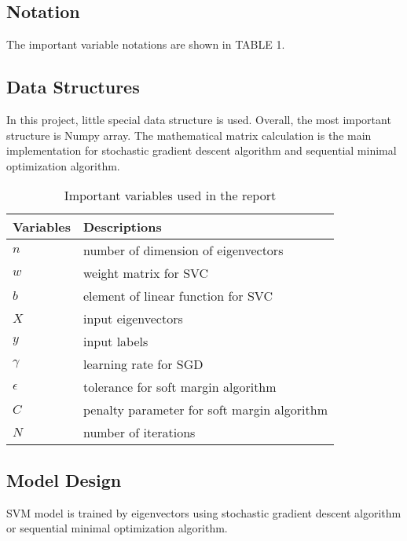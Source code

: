\documentclass[9pt,shortpaper,twoside,web]{ieeecolor}
\begin{document}
\subsection{Notation}
The important variable notations are shown in TABLE 1.

\subsection{Data Structures}
In this project, little special data structure is used. Overall, the most important structure is Numpy array. The mathematical matrix calculation is the main implementation for stochastic gradient descent algorithm and sequential minimal optimization algorithm.

\begin{table}[]
\centering
\caption{Important variables used in the report}
\label{tab:var}
\begin{tabular}{ll}
\multicolumn{1}{c}{Variables} & Descriptions                                             \\ \hline
$n$                           & number of dimension of eigenvectors \\
$w$ 					      & weight matrix for SVC\\
$b$ 					      & element of linear function for SVC \\
$X$							  & input eigenvectors  \\
$y$							  & input labels  \\
$\gamma$                      & learning rate for SGD             \\
$\epsilon$					  & tolerance for soft margin algorithm\\
$C$							  & penalty parameter for soft margin algorithm\\
$N$                           & number of iterations             
\end{tabular}
\end{table}

\subsection{Model Design}
SVM model is trained by eigenvectors using stochastic gradient descent algorithm or sequential minimal optimization algorithm. 
\end{document}

